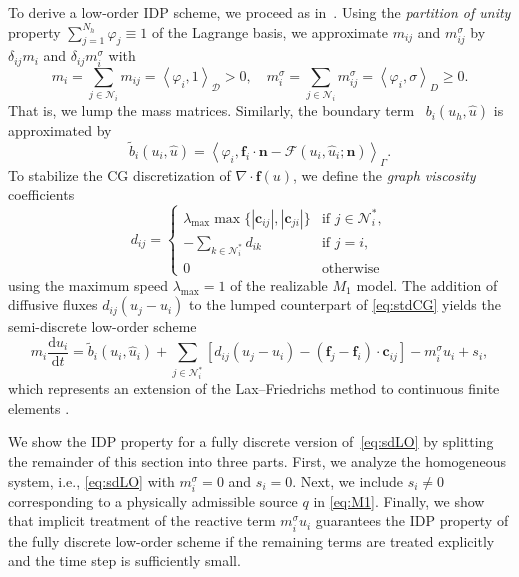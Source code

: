 \documentclass[preprint, 11pt]{elsarticle}
\newcommand{\diff}{\mathrm{d} }
\newcommand{\N}{\mathcal{N}}
\newcommand{\x}{\mathbf{x}}
\newcommand{\s}{\mathbf{s}}
\newcommand{\n}{\mathbf{n}}
\newcommand{\f}{\mathbf{f}}
\newcommand{\con}{\mathbf{c}}
\newcommand{\D}{\mathcal{D}}
\newcommand{\sprod}[2]{\left\langle #1, #2 \right\rangle}
\begin{document}
To derive a low-order IDP scheme, we
proceed as in~\cite{guermond2016,kuzmin2020,kuzmin2023}.
Using the \textit{partition of unity} property $\sum_{j=1}^{N_h} \varphi_j\equiv 1$ of the Lagrange basis, we approximate $m_{ij}$ and $m_{ij}^\sigma$ by
 $\delta_{ij}m_i$ and $\delta_{ij}m_i^\sigma$ with
\begin{equation*}
    m_i = \sum_{j\in\N_i} m_{ij} = \sprod{\varphi_i}{1}_\D >0,\quad %
    m_i^\sigma = \sum_{j\in\N_i} m_{ij}^\sigma = \sprod{\varphi_i}{\sigma}_D\geq 0.
\end{equation*}
That is, we lump the mass matrices.
Similarly, the boundary term~ $b_i(u_h, \hat u)$ is approximated by
\begin{equation}\label{eq:lumpedbdr}
    \tilde{b}_i(u_i, \hat u) = \sprod{\varphi_i}{\f_i \cdot \n - \mathcal{F}(u_i, \hat u_i;\n)}_\Gamma. %
\end{equation}
To stabilize the CG discretization of $\nabla\cdot\f(u)$, we define the \emph{graph viscosity} coefficients
\begin{equation*}
    d_{ij} = \begin{cases}
        \lambda_{\max}\max\{|\con_{ij}|, |\con_{ji}|\} &\text{if }j\in\N_i^*,\\
        -\sum_{k\in\N_i^*}d_{ik} &\text{if } j=i,\\
        0&\text{otherwise}
    \end{cases}
\end{equation*}
using the maximum speed $\lambda_{\max} = 1$ of the realizable
$M_1$ model. The addition of diffusive fluxes $d_{ij} (u_j -u_i)$
to the lumped counterpart of \eqref{eq:stdCG}
yields the semi-discrete low-order scheme
\begin{equation}\label{eq:sdLO}
    m_i\frac{\diff u_i}{\diff t} = \tilde{b}_i(u_i, \hat u_i) + \sum_{j \in\N_i^*} \left[d_{ij} (u_j -u_i) - (\f_j-\f_i)\cdot \con_{ij}\right] - m_i^{\sigma}u_i + s_i,
\end{equation}
which represents an extension of the
 Lax--Friedrichs method to continuous finite elements \cite{kuzmin2023}.
 \smallskip
 
We show the IDP property for a fully discrete version of~\eqref{eq:sdLO} by splitting the remainder of this section into three parts.
First, we analyze the homogeneous system, i.e., \eqref{eq:sdLO}
with $m_{i}^\sigma=0$ and $s_i=0$. Next, we include
$s_i\ne 0$ corresponding to a physically admissible source $q$
in \eqref{eq:M1}. Finally, we show that implicit treatment of
the reactive term $m_i^\sigma u_i$ guarantees the IDP property of 
the fully discrete low-order scheme if the remaining terms
are treated explicitly and the time step is sufficiently small.
\end{document}
